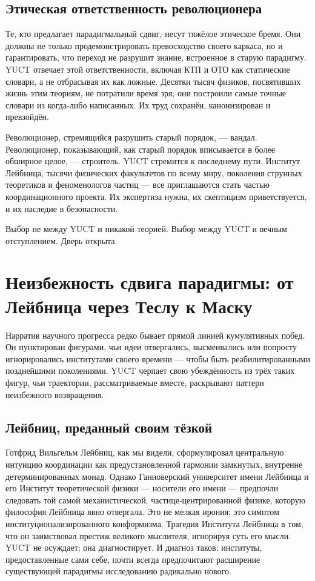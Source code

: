 \documentclass[12pt,a4paper]{article}
\begin{document}
	\subsection{Этическая ответственность революционера}
	
	Те, кто предлагает парадигмальный сдвиг, несут тяжёлое этическое бремя. Они должны не только продемонстрировать превосходство своего каркаса, но и гарантировать, что переход не разрушит знание, встроенное в старую парадигму. YUCT отвечает этой ответственности, включая КТП и ОТО как статические словари, а не отбрасывая их как ложные. Десятки тысяч физиков, посвятивших жизнь этим теориям, не потратили время зря; они построили самые точные словари из когда‑либо написанных. Их труд сохранён, канонизирован и превзойдён.
	
	Революционер, стремящийся разрушить старый порядок, — вандал. Революционер, показывающий, как старый порядок вписывается в более обширное целое, — строитель. YUCT стремится к последнему пути. Институт Лейбница, тысячи физических факультетов по всему миру, поколения струнных теоретиков и феноменологов частиц — все приглашаются стать частью координационного проекта. Их экспертиза нужна, их скептицизм приветствуется, и их наследие в безопасности.
	
	Выбор не между YUCT и никакой теорией. Выбор между YUCT и вечным отступлением. Дверь открыта.
	
	\section{Неизбежность сдвига парадигмы: от Лейбница через Теслу к Маску}
	
	Нарратив научного прогресса редко бывает прямой линией кумулятивных побед. Он пунктирован фигурами, чьи идеи отвергались, высмеивались или попросту игнорировались институтами своего времени — чтобы быть реабилитированными позднейшими поколениями. YUCT черпает свою убеждённость из трёх таких фигур, чьи траектории, рассматриваемые вместе, раскрывают паттерн неизбежного возвращения.
	
	\subsection{Лейбниц, преданный своим тёзкой}
	
	Готфрид Вильгельм Лейбниц, как мы видели, сформулировал центральную интуицию координации как предустановленной гармонии замкнутых, внутренне детерминированных монад. Однако Ганноверский университет имени Лейбница и его Институт теоретической физики — носители его имени — предпочли следовать той самой механистической, частице‑центрированной физике, которую философия Лейбница явно отвергала. Это не мелкая ирония; это симптом институционализированного конформизма. Трагедия Института Лейбница в том, что он заимствовал престиж великого мыслителя, игнорируя суть его мысли. YUCT не осуждает; она диагностирует. И диагноз таков: институты, предоставленные сами себе, почти всегда предпочитают расширение существующей парадигмы исследованию радикально нового.
	
\end{document}
